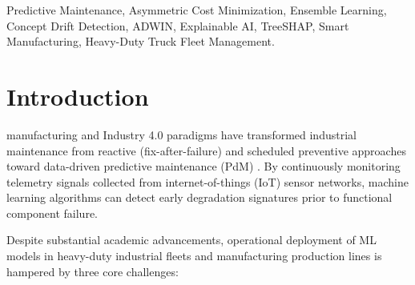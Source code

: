 \documentclass[conference]{IEEEtran}
\begin{document}
\begin{IEEEkeywords}
Predictive Maintenance, Asymmetric Cost Minimization, Ensemble Learning, Concept Drift Detection, ADWIN, Explainable AI, TreeSHAP, Smart Manufacturing, Heavy-Duty Truck Fleet Management.
\end{IEEEkeywords}

\section{Introduction}
 manufacturing and Industry 4.0 paradigms have transformed industrial maintenance from reactive (fix-after-failure) and scheduled preventive approaches toward data-driven predictive maintenance (PdM) \cite{roslan2024}. By continuously monitoring telemetry signals collected from internet-of-things (IoT) sensor networks, machine learning algorithms can detect early degradation signatures prior to functional component failure.

Despite substantial academic advancements, operational deployment of ML models in heavy-duty industrial fleets and manufacturing production lines is hampered by three core challenges:
\end{document}
